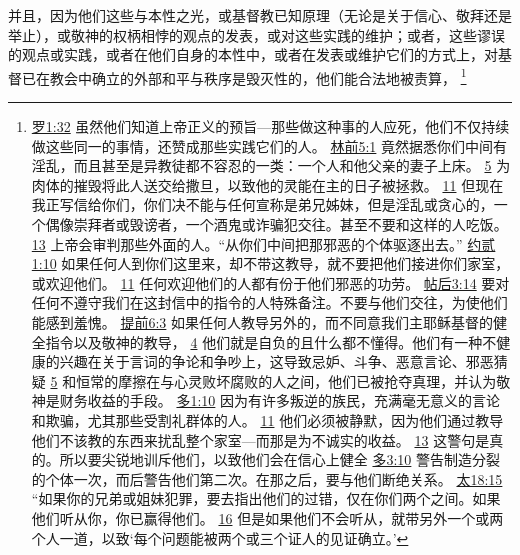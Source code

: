 \documentclass[12pt, a4paper, oneside]{ctexart}
\begin{document}
	并且，因为他们这些与本性之光，或基督教已知原理（无论是关于信心、敬拜还是举止），或敬神的权柄相悖的观点的发表，或对这些实践的维护；或者，这些谬误的观点或实践，或者在他们自身的本性中，或者在发表或维护它们的方式上，对基督已在教会中确立的外部和平与秩序是毁灭性的，他们能合法地被责算，
	\footnote {
		\href{https://biblehub.com/romans/1-32.htm}{罗1:32} 虽然他们知道上帝正义的预旨---那些做这种事的人应死，他们不仅持续做这些同一的事情，还赞成那些实践它们的人。
		\href{https://biblehub.com/1_corinthians/5-1.htm}{林前5:1} 竟然据悉你们中间有淫乱，而且甚至是异教徒都不容忍的一类：一个人和他父亲的妻子上床。
		\href{https://biblehub.com/1_corinthians/5-5.htm}{5} 为肉体的摧毁将此人送交给撒旦，以致他的灵能在主的日子被拯救。
		\href{https://biblehub.com/1_corinthians/5-11.htm}{11} 但现在我正写信给你们，你们决不能与任何宣称是弟兄姊妹，但是淫乱或贪心的，一个偶像崇拜者或毁谤者，一个酒鬼或诈骗犯交往。甚至不要和这样的人吃饭。
		\href{https://biblehub.com/1_corinthians/5-13.htm}{13} 上帝会审判那些外面的人。“从你们中间把那邪恶的个体驱逐出去。”
		\href{https://biblehub.com/2_john/1-10.htm}{约贰1:10} 如果任何人到你们这里来，却不带这教导，就不要把他们接进你们家室，或欢迎他们。
		\href{https://biblehub.com/2_john/1-11.htm}{11} 任何欢迎他们的人都有份于他们邪恶的功劳。
		\href{https://biblehub.com/2_thessalonians/3-14.htm}{帖后3:14} 要对任何不遵守我们在这封信中的指令的人特殊备注。不要与他们交往，为使他们能感到羞愧。
		\href{https://biblehub.com/1_timothy/6-3.htm}{提前6:3} 如果任何人教导另外的，而不同意我们主耶稣基督的健全指令以及敬神的教导，
		\href{https://biblehub.com/1_timothy/6-4.htm}{4} 他们就是自负的且什么都不懂得。他们有一种不健康的兴趣在关于言词的争论和争吵上，这导致忌妒、斗争、恶意言论、邪恶猜疑
		\href{https://biblehub.com/1_timothy/6-5.htm}{5} 和恒常的摩擦在与心灵败坏腐败的人之间，他们已被抢夺真理，并认为敬神是财务收益的手段。
		\href{https://biblehub.com/titus/1-10.htm}{多1:10} 因为有许多叛逆的族民，充满毫无意义的言论和欺骗，尤其那些受割礼群体的人。
		\href{https://biblehub.com/titus/1-11.htm}{11} 他们必须被静默，因为他们通过教导他们不该教的东西来扰乱整个家室---而那是为不诚实的收益。
		\href{https://biblehub.com/titus/1-13.htm}{13} 这警句是真的。所以要尖锐地训斥他们，以致他们会在信心上健全
		\href{https://biblehub.com/titus/3-10.htm}{多3:10} 警告制造分裂的个体一次，而后警告他们第二次。在那之后，要与他们断绝关系。
		\href{https://biblehub.com/matthew/18-15.htm}{太18:15} “如果你的兄弟或姐妹犯罪，要去指出他们的过错，仅在你们两个之间。如果他们听从你，你已赢得他们。
		\href{https://biblehub.com/matthew/18-16.htm}{16} 但是如果他们不会听从，就带另外一个或两个人一道，以致‘每个问题能被两个或三个证人的见证确立。’
}
\end{document}
